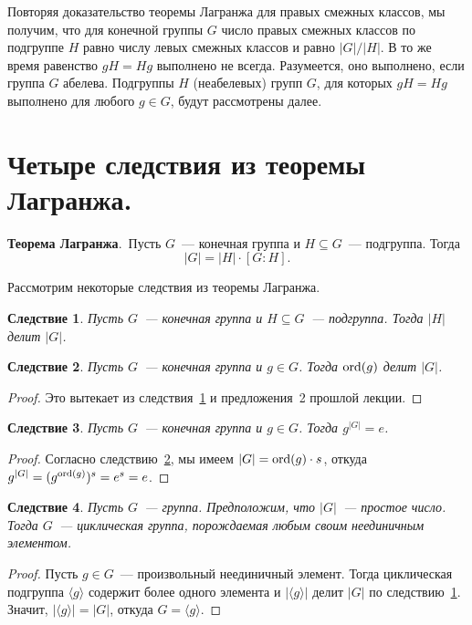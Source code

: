 \documentclass[a4paper, 12pt]{article}
\def\ord{{\rm ord}}%
\def\ord{{\rm ord}}
\def\ord{{\rm ord}}
\newtheorem{corollary}{Следствие}
\theoremstyle{definition}
\theoremstyle{remark}
\begin{document}
Повторяя доказательство теоремы Лагранжа для правых смежных классов,
мы получим, что для конечной группы $G$ число правых смежных классов
по подгруппе $H$ равно числу левых смежных классов и равно
$|G|/|H|$. 
В то же время равенство $gH=Hg$ выполнено не всегда.
Разумеется, оно выполнено, если группа $G$ абелева. 
Подгруппы $H$
(неабелевых) групп $G$, для которых $gH=Hg$ выполнено для любого
$g\in G$, будут рассмотрены далее.

\section{Четыре следствия из теоремы Лагранжа.}

{\bf Теорема Лагранжа}.\ Пусть $G$~--- конечная группа и $H\subseteq
G$~--- подгруппа. Тогда
$$
|G| = |H| \cdot [G:H].
$$

Рассмотрим некоторые следствия из теоремы Лагранжа.

\begin{corollary} \label{c1}
Пусть $G$~--- конечная группа и $H\subseteq G$~--- подгруппа. 
Тогда
$|H|$ делит $|G|$.
\end{corollary}

\begin{corollary} \label{c2}
Пусть $G$~--- конечная группа и $g\in G$. 
Тогда $\ord(g)$ делит
$|G|$.
\end{corollary}

\begin{proof}
Это вытекает из следствия~\ref{c1} и предложения~2 прошлой лекции.
\end{proof}

\begin{corollary} \label{c3}
Пусть $G$~--- конечная группа и $g\in G$. 
Тогда $g^{|G|}=e$.
\end{corollary}

\begin{proof}
Согласно следствию~\ref{c2}, мы имеем $|G|=\ord(g) \cdot s$, откуда
$g^{|G|}=(g^{\ord(g)})^s=e^s=e$.
\end{proof}

\begin{corollary} \label{c5}
Пусть $G$~--- группа. 
Предположим, что $|G|$~--- простое число.
Тогда $G$~--- циклическая группа, порождаемая любым своим
неединичным элементом.
\end{corollary}

\begin{proof}
Пусть $g\in G$~--- произвольный неединичный элемент. 
Тогда
циклическая подгруппа $\langle g\rangle$ содержит более одного
элемента и $|\langle g\rangle|$ делит $|G|$ по следствию~\ref{c1}.
Значит, $|\langle g\rangle|=|G|$, откуда $G=\langle g\rangle$.
\end{proof}
\end{document}
